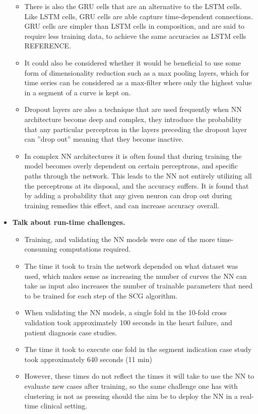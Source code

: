 \begin{itemize}
\begin{itemize}
        \item There is also the GRU cells that are an alternative to the LSTM cells. Like LSTM cells, GRU cells are able capture time-dependent connections. GRU cells are simpler than LSTM cells in composition, and are said to require less training data, to achieve the same accuracies as LSTM cells REFERENCE.
        \item It could also be considered whether it would be beneficial to use some form of dimensionality reduction such as a max pooling layers, which for time series can be considered as a max-filter where only the highest value in a segment of a curve is kept on. 
        \item Dropout layers are also a technique that are used frequently when NN architecture become deep and complex, they introduce the probability that any particular perceptron in the layers preceding the dropout layer can ''drop out'' meaning that they become inactive.
        \item In complex NN architectures it is often found that during training the model becomes overly dependent on certain perceptrons, and specific paths through the network. This leads to the NN not entirely utilizing all the perceptrons at its disposal, and the accuracy suffers. It is found that by adding a probability that any given neuron can drop out during training remedies this effect, and can increase accuracy overall.
    \end{itemize}
    \item \textbf{Talk about run-time challenges.}
    \begin{itemize}
        \item Training, and validating the NN models were one of the more time-consuming computations required.
        \item The time it took to train the network depended on what dataset was used, which makes sense as increasing the number of curves the NN can take as input also increases the number of trainable parameters that need to be trained for each step of the SCG algorithm.
        \item When validating the NN models, a single fold in the 10-fold cross validation took approximately 100 seconds in the heart failure, and patient diagnosis case studies.
        \item The time it took to execute one fold in the segment indication case study took approximately 640 seconds (11 min)
        \item However, these times do not reflect the times it will take to use the NN to evaluate new cases after training, so the same challenge one has with clustering is not as pressing should the aim be to deploy the NN in a real-time clinical setting.
    \end{itemize}
\end{itemize}

